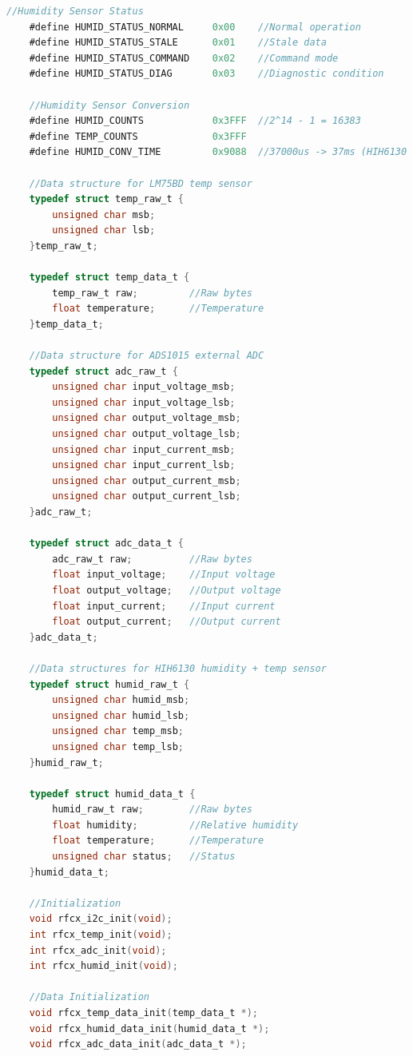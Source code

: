\documentclass{article}
\numberwithin{figure}{section}
\numberwithin{equation}{section}
\begin{document}
{\begin{lstlisting}[language=C,label=lst:rfcx-i2c.h,caption=rfcx-i2c.h]
    //Humidity Sensor Status
    #define HUMID_STATUS_NORMAL     0x00    //Normal operation
    #define HUMID_STATUS_STALE      0x01    //Stale data
    #define HUMID_STATUS_COMMAND    0x02    //Command mode
    #define HUMID_STATUS_DIAG       0x03    //Diagnostic condition

    //Humidity Sensor Conversion
    #define HUMID_COUNTS            0x3FFF  //2^14 - 1 = 16383
    #define TEMP_COUNTS             0x3FFF
    #define HUMID_CONV_TIME         0x9088  //37000us -> 37ms (HIH6130 datasheet specifies 36.65ms conversion time)

    //Data structure for LM75BD temp sensor
    typedef struct temp_raw_t {
        unsigned char msb;
        unsigned char lsb;
    }temp_raw_t;

    typedef struct temp_data_t {
        temp_raw_t raw;         //Raw bytes
        float temperature;      //Temperature
    }temp_data_t;

    //Data structure for ADS1015 external ADC
    typedef struct adc_raw_t {
        unsigned char input_voltage_msb;
        unsigned char input_voltage_lsb;
        unsigned char output_voltage_msb;
        unsigned char output_voltage_lsb;
        unsigned char input_current_msb;
        unsigned char input_current_lsb;
        unsigned char output_current_msb;
        unsigned char output_current_lsb;
    }adc_raw_t;

    typedef struct adc_data_t {
        adc_raw_t raw;          //Raw bytes
        float input_voltage;    //Input voltage
        float output_voltage;   //Output voltage
        float input_current;    //Input current
        float output_current;   //Output current
    }adc_data_t;

    //Data structures for HIH6130 humidity + temp sensor
    typedef struct humid_raw_t {
        unsigned char humid_msb;
        unsigned char humid_lsb;
        unsigned char temp_msb;
        unsigned char temp_lsb;
    }humid_raw_t;

    typedef struct humid_data_t {
        humid_raw_t raw;        //Raw bytes
        float humidity;         //Relative humidity
        float temperature;      //Temperature
        unsigned char status;   //Status
    }humid_data_t;

    //Initialization
    void rfcx_i2c_init(void);
    int rfcx_temp_init(void);
    int rfcx_adc_init(void);
    int rfcx_humid_init(void);

    //Data Initialization
    void rfcx_temp_data_init(temp_data_t *);
    void rfcx_humid_data_init(humid_data_t *);
    void rfcx_adc_data_init(adc_data_t *);


\end{lstlisting}}
\end{document}
